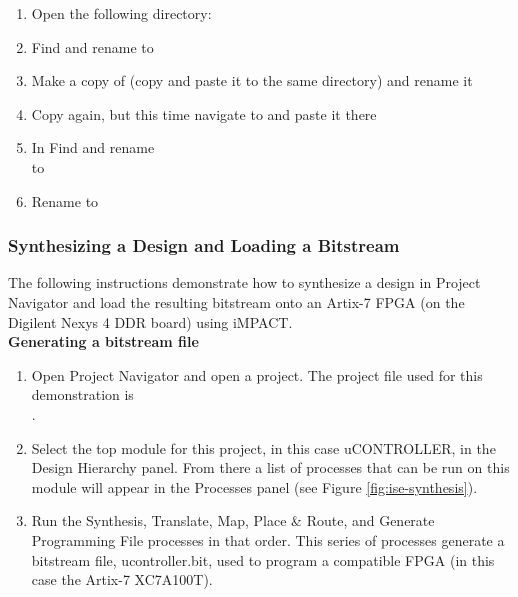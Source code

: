 \begin{enumerate}
	\item Open the following directory: 
	\item Find and rename  to 
	\item Make a copy of  (copy and paste it to the same directory) and rename it 
	\item Copy  again, but this time navigate to  and paste it there
	\item In  Find and rename\\  to 
	\item Rename  to 
\end{enumerate}

\subsubsection{Synthesizing a Design and Loading a Bitstream} \label{synthesis-loading}
The following instructions demonstrate how to synthesize a design in Project Navigator and load the resulting bitstream onto an Artix-7 FPGA (on the Digilent Nexys 4 DDR board) using iMPACT.\\

\textbf{Generating a bitstream file}
\begin{enumerate}
	\item Open Project Navigator and open a project. The project file used for this demonstration is\\ .
	\item Select the top module for this project, in this case uCONTROLLER, in the Design Hierarchy panel. From there a list of processes that can be run on this module will appear in the Processes panel (see Figure \ref{fig:ise-synthesis}).
	\item Run the Synthesis, Translate, Map, Place \& Route, and Generate Programming File processes in that order. This series of processes generate a bitstream file, ucontroller.bit, used to program a compatible FPGA (in this case the Artix-7 XC7A100T).
\end{enumerate}

